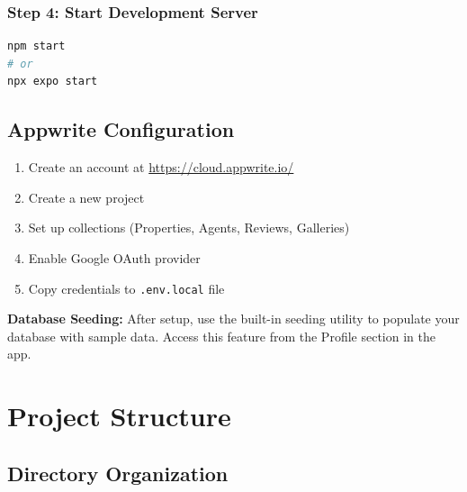 \documentclass[11pt,a4paper,oneside]{book}
\begin{document}
\subsection{Step 4: Start Development Server}

\begin{lstlisting}[language=bash]
npm start
# or
npx expo start
\end{lstlisting}

\section{Appwrite Configuration}

\begin{enumerate}
    \item Create an account at \url{https://cloud.appwrite.io/}
    \item Create a new project
    \item Set up collections (Properties, Agents, Reviews, Galleries)
    \item Enable Google OAuth provider
    \item Copy credentials to \texttt{.env.local} file
\end{enumerate}

\begin{notebox}
\textbf{Database Seeding:} After setup, use the built-in seeding utility to populate your database with sample data. Access this feature from the Profile section in the app.
\end{notebox}

\chapter{Project Structure}

\section{Directory Organization}
\end{document}
